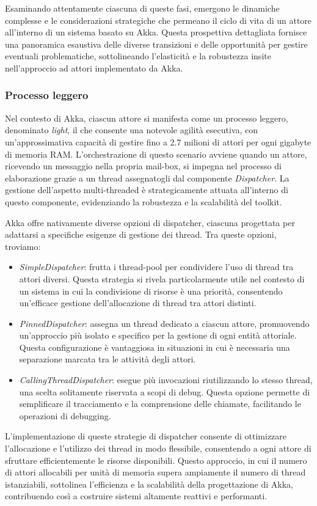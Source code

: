 Esaminando attentamente ciascuna di queste fasi, emergono le dinamiche complesse e le considerazioni strategiche che permeano il ciclo di vita di un attore all'interno di un sistema basato su Akka.
Questa prospettiva dettagliata fornisce una panoramica esaustiva delle diverse transizioni e delle opportunità per gestire eventuali problematiche, sottolineando l'elasticità e la robustezza insite nell'approccio ad attori implementato da Akka.

\subsubsection[Processo leggero]{Processo leggero}
Nel contesto di Akka, ciascun attore si manifesta come un processo leggero, denominato \textit{light}, il che consente una notevole agilità esecutiva, con un'approssimativa capacità di gestire fino a 2.7 milioni di attori per ogni gigabyte di memoria RAM.
L'orchestrazione di questo scenario avviene quando un attore, ricevendo un messaggio nella propria mail-box, si impegna nel processo di elaborazione grazie a un thread assegnatogli dal componente \textit{Dispatcher}.
La gestione dell'aspetto multi-threaded è strategicamente attuata all'interno di questo componente, evidenziando la robustezza e la scalabilità del toolkit.

Akka offre nativamente diverse opzioni di dispatcher, ciascuna progettata per adattarsi a specifiche esigenze di gestione dei thread. Tra queste opzioni, troviamo:
\begin{itemize}
  \item \textit{SimpleDispatcher}: frutta i thread-pool per condividere l'uso di thread tra attori diversi.
  Questa strategia si rivela particolarmente utile nel contesto di un sistema in cui la condivisione di risorse è una priorità, consentendo un'efficace gestione dell'allocazione di thread tra attori distinti.
  \item \textit{PinnedDispatcher}: assegna un thread dedicato a ciascun attore, promuovendo un'approccio più isolato e specifico per la gestione di ogni entità attoriale.
  Questa configurazione è vantaggiosa in situazioni in cui è necessaria una separazione marcata tra le attività degli attori.
  \item \textit{CallingThreadDispatcher}: esegue più invocazioni riutilizzando lo stesso thread, una scelta solitamente riservata a scopi di debug.
  Questa opzione permette di semplificare il tracciamento e la comprensione delle chiamate, facilitando le operazioni di debugging.
\end{itemize}
L'implementazione di queste strategie di dispatcher consente di ottimizzare l'allocazione e l'utilizzo dei thread in modo flessibile, consentendo a ogni attore di sfruttare efficientemente le risorse disponibili.
Questo approccio, in cui il numero di attori allocabili per unità di memoria supera ampiamente il numero di thread istanziabili, sottolinea l'efficienza e la scalabilità della progettazione di Akka, contribuendo così a costruire sistemi altamente reattivi e performanti.

